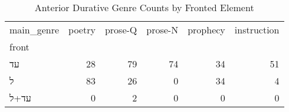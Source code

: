 \begin{table}[htbp!]
\centering
\caption{Anterior Durative Genre Counts by Fronted Element}
\label{table:antdur_gen_ct}
\begin{tabular}{lrrrrr}
\toprule
main\_genre &  poetry &  prose-Q &  prose-N &  prophecy &  instruction \\
front &         &          &          &           &              \\
\midrule
עד    &      28 &       79 &       74 &        34 &           51 \\
ל     &      83 &       26 &        0 &        34 &            4 \\
עד+ל  &       0 &        2 &        0 &         0 &            0 \\
\bottomrule
\end{tabular}
\end{table}
